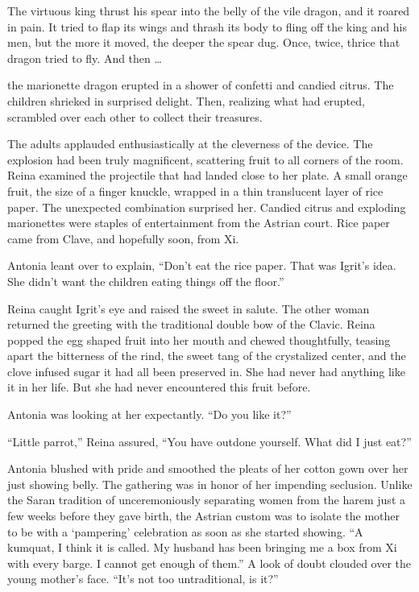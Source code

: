 \documentclass{article}
\begin{document}
	The virtuous king thrust his spear into the belly of the vile dragon, and it roared in pain. It tried to flap its wings and thrash its body to fling off the king and his men, but the more it moved, the  deeper the spear dug. Once, twice, thrice that dragon tried to fly. And then …
	
	the marionette dragon erupted in a shower of confetti and candied citrus. The children shrieked in surprised delight. Then, realizing what had erupted, scrambled over each other to collect their treasures.
	
	The adults applauded enthusiastically at the cleverness of the device. The explosion had been truly magnificent, scattering fruit to all corners of the room. Reina examined the projectile that had landed close to her plate. A small orange fruit, the size of a finger knuckle, wrapped in a thin translucent layer of rice paper. The unexpected combination surprised her. Candied citrus and exploding marionettes were staples of entertainment from the Astrian court. Rice paper came from Clave, and hopefully soon, from Xi. 
	
	Antonia leant over to explain, “Don’t eat the rice paper. That was Igrit’s idea. She didn’t want the children eating things off the floor.” 
	
	Reina caught Igrit’s eye and raised the sweet in salute. The other woman returned the greeting with the traditional double bow of the Clavic. Reina popped the egg shaped fruit into her mouth and chewed thoughtfully, teasing apart the bitterness of the rind, the sweet tang of the crystalized center, and the clove infused sugar it had all been preserved in. She had never had anything like it in her life. But she had never encountered this fruit before. 
	
	Antonia was looking at her expectantly. “Do you like it?”
	
	“Little parrot,” Reina assured, “You have outdone yourself. What did I just eat?”
	
	Antonia blushed with pride and smoothed the pleats of her cotton gown over her just showing belly. The gathering was in honor of her impending seclusion. Unlike the Saran tradition of unceremoniously separating women from the harem just a few weeks before they gave birth, the Astrian custom was to isolate the mother to be with a ‘pampering’ celebration as soon as she started showing. “A kumquat, I think it is called. My husband has been bringing me a box from Xi with every barge. I cannot get enough of them.” A look of doubt clouded over the young mother’s face. “It’s not too untraditional, is it?”
	
\end{document}
